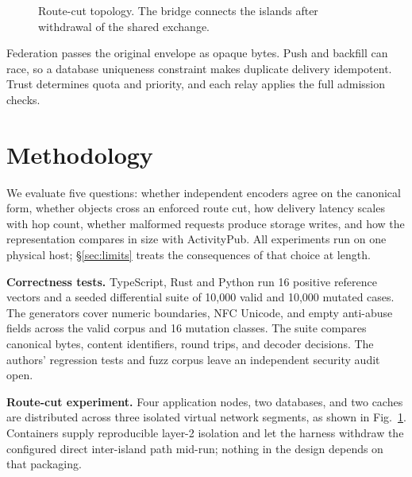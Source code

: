 \documentclass[conference,a4paper,10pt]{IEEEtran}
\begin{document}
\begin{figure}[t]
  \centering
  \caption{Route-cut topology. The bridge connects the islands after withdrawal of the shared exchange.}
  \label{fig:topology}
\end{figure}

Federation passes the original envelope as opaque bytes. Push and backfill can race, so a database uniqueness constraint makes duplicate delivery idempotent. Trust determines quota and priority, and each relay applies the full admission checks.

\section{Methodology}
\label{sec:method}

We evaluate five questions: whether independent encoders agree on the
canonical form, whether objects cross an enforced route cut, how delivery
latency scales with hop count, whether malformed requests produce storage
writes, and how the representation compares in size with ActivityPub. All
experiments run on one physical host; \S\ref{sec:limits} treats the
consequences of that choice at length.

\textbf{Correctness tests.} TypeScript, Rust and Python run 16 positive reference vectors and a seeded differential suite of 10,000 valid and 10,000 mutated cases. The generators cover numeric boundaries, NFC Unicode, and empty anti-abuse fields across the valid corpus and 16 mutation classes. The suite compares canonical bytes, content identifiers, round trips, and decoder decisions. The authors' regression tests and fuzz corpus leave an independent security audit open.

\textbf{Route-cut experiment.} Four application nodes, two databases, and two
caches are distributed across three isolated virtual network segments, as
shown in Fig.~\ref{fig:topology}. Containers supply reproducible layer-2
isolation and let the harness withdraw the configured direct inter-island path
mid-run; nothing in the design depends on that packaging.
\end{document}
